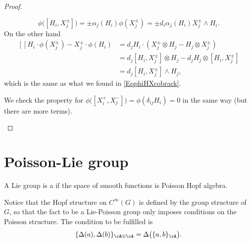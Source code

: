 \begin{proof}
\begin{enumerate}
		      \begin{equation}        \label{EqphiHXcobrack}
			      \phi\big( [H_i,X_j^{\pm}] \big)=\pm\alpha_j(H_i)\phi(X_j^{\pm})=\pm d_i\alpha_j(H_i) X_j^{\pm}\wedge H_i.
		      \end{equation}
		      On the other hand
		      \begin{equation}
			      \begin{aligned}[]
				      H_i\cdot \phi(X_j^{\pm})-X_j^{\pm}\cdot\phi(H_i) & =d_j H_i\cdot(X_j^{\pm}\otimes H_j-H_j\otimes X_j^{\pm})     \\
				                                                       & =d_j[H_i,X_j^{\pm}]\otimes H_j-d_j H_j\otimes[H_i,X_j^{\pm}] \\
				                                                       & =d_j[H_i,X_j^{\pm}]\wedge H_j,
			      \end{aligned}
		      \end{equation}
		      which is the same as what we found in \eqref{EqphiHXcobrack}.

		      We check the property for \( \phi\big( [X_i^+,X_j^-] \big)=\phi(\delta_{ij}H_i)=0\) in the same way (but there are more terms).
	\end{enumerate}

\end{proof}


\section{Poisson-Lie group}

\begin{definition}
	A Lie group is a  if the space of smooth functions is Poisson Hopf algebra.
\end{definition}
Notice that the Hopf structure on $ C^{\infty}(G)$ is defined by the group structure of $G$, so that the fact to be a Lie-Poisson group only imposes conditions on the Poisson structure. The condition to be fulfilled is
\begin{equation}	\label{EqCondcmpDelPoiss}
	\{ \Delta(a),\Delta(b) \}_{\cA\otimes\cA}=\Delta\big( \{ a,b \}_{\cA} \big).
\end{equation}

